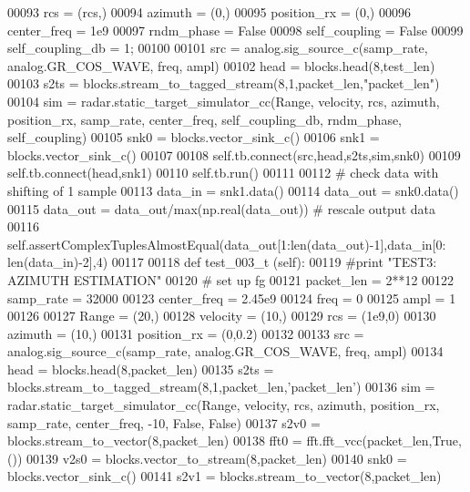 \begin{DoxyCode}
00093         rcs = (rcs,)
00094         azimuth = (0,)
00095         position\_rx = (0,)
00096         center\_freq = 1e9
00097         rndm\_phase = \textcolor{keyword}{False}
00098         self\_coupling = \textcolor{keyword}{False}
00099         self\_coupling\_db = 1;
00100         
00101         src = analog.sig\_source\_c(samp\_rate, analog.GR\_COS\_WAVE, freq, ampl)
00102         head = blocks.head(8,test\_len)
00103         s2ts = blocks.stream\_to\_tagged\_stream(8,1,packet\_len,\textcolor{stringliteral}{"packet\_len"})
00104         sim = radar.static\_target\_simulator\_cc(Range, velocity, rcs, azimuth, position\_rx, samp\_rate, 
      center\_freq, self\_coupling\_db, rndm\_phase, self\_coupling)
00105         snk0 = blocks.vector\_sink\_c()
00106         snk1 = blocks.vector\_sink\_c()
00107         
00108         self.tb.connect(src,head,s2ts,sim,snk0)
00109         self.tb.connect(head,snk1)
00110         self.tb.run()
00111         
00112         \textcolor{comment}{# check data with shifting of 1 sample}
00113         data\_in = snk1.data()
00114         data\_out = snk0.data()
00115         data\_out = data\_out/max(np.real(data\_out)) \textcolor{comment}{# rescale output data}
00116         self.assertComplexTuplesAlmostEqual(data\_out[1:len(data\_out)-1],data\_in[0:
      len(data\_in)-2],4)
00117         
00118     \textcolor{keyword}{def }test_003_t (self):
00119         \textcolor{comment}{#print "TEST3: AZIMUTH ESTIMATION"}
00120         \textcolor{comment}{# set up fg}
00121         packet\_len = 2**12
00122         samp\_rate = 32000
00123         center\_freq = 2.45e9
00124         freq = 0
00125         ampl = 1
00126         
00127         Range = (20,)
00128         velocity = (10,)
00129         rcs = (1e9,0)
00130         azimuth = (10,)
00131         position\_rx = (0,0.2)
00132         
00133         src = analog.sig\_source\_c(samp\_rate, analog.GR\_COS\_WAVE, freq, ampl)
00134         head = blocks.head(8,packet\_len)
00135         s2ts = blocks.stream\_to\_tagged\_stream(8,1,packet\_len,\textcolor{stringliteral}{'packet\_len'})
00136         sim = radar.static\_target\_simulator\_cc(Range, velocity, rcs, azimuth, position\_rx, samp\_rate, 
      center\_freq, -10, \textcolor{keyword}{False}, \textcolor{keyword}{False})
00137         s2v0 = blocks.stream\_to\_vector(8,packet\_len)
00138         fft0 = fft.fft\_vcc(packet\_len,\textcolor{keyword}{True},())
00139         v2s0 = blocks.vector\_to\_stream(8,packet\_len)
00140         snk0 = blocks.vector\_sink\_c()
00141         s2v1 = blocks.stream\_to\_vector(8,packet\_len)

\end{DoxyCode}
